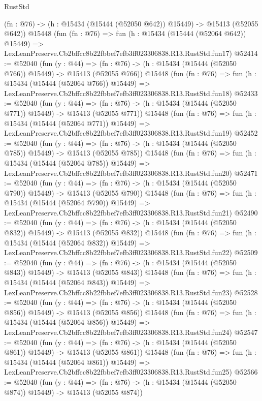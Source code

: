 \begin{lexlean}{RustStd}
\begin{coremodule}
    (fn : @76) -> (h : @15434 (@15444 (@52050 @642)) @15449) -> @15413 (@52055 @642))
    @15448
    (fun (fn : @76) =>
    fun (h : @15434 (@15444 (@52064 @642)) @15449) =>
    LexLeanPreserve.Cb2bffcc8b22fbbef7efb3ff023306838.R13.RustStd.fun17)
@52414 := @52040
    (fun (y : @44) =>
    (fn : @76) -> (h : @15434 (@15444 (@52050 @766)) @15449) -> @15413 (@52055 @766))
    @15448
    (fun (fn : @76) =>
    fun (h : @15434 (@15444 (@52064 @766)) @15449) =>
    LexLeanPreserve.Cb2bffcc8b22fbbef7efb3ff023306838.R13.RustStd.fun18)
@52433 := @52040
    (fun (y : @44) =>
    (fn : @76) -> (h : @15434 (@15444 (@52050 @771)) @15449) -> @15413 (@52055 @771))
    @15448
    (fun (fn : @76) =>
    fun (h : @15434 (@15444 (@52064 @771)) @15449) =>
    LexLeanPreserve.Cb2bffcc8b22fbbef7efb3ff023306838.R13.RustStd.fun19)
@52452 := @52040
    (fun (y : @44) =>
    (fn : @76) -> (h : @15434 (@15444 (@52050 @785)) @15449) -> @15413 (@52055 @785))
    @15448
    (fun (fn : @76) =>
    fun (h : @15434 (@15444 (@52064 @785)) @15449) =>
    LexLeanPreserve.Cb2bffcc8b22fbbef7efb3ff023306838.R13.RustStd.fun20)
@52471 := @52040
    (fun (y : @44) =>
    (fn : @76) -> (h : @15434 (@15444 (@52050 @790)) @15449) -> @15413 (@52055 @790))
    @15448
    (fun (fn : @76) =>
    fun (h : @15434 (@15444 (@52064 @790)) @15449) =>
    LexLeanPreserve.Cb2bffcc8b22fbbef7efb3ff023306838.R13.RustStd.fun21)
@52490 := @52040
    (fun (y : @44) =>
    (fn : @76) -> (h : @15434 (@15444 (@52050 @832)) @15449) -> @15413 (@52055 @832))
    @15448
    (fun (fn : @76) =>
    fun (h : @15434 (@15444 (@52064 @832)) @15449) =>
    LexLeanPreserve.Cb2bffcc8b22fbbef7efb3ff023306838.R13.RustStd.fun22)
@52509 := @52040
    (fun (y : @44) =>
    (fn : @76) -> (h : @15434 (@15444 (@52050 @843)) @15449) -> @15413 (@52055 @843))
    @15448
    (fun (fn : @76) =>
    fun (h : @15434 (@15444 (@52064 @843)) @15449) =>
    LexLeanPreserve.Cb2bffcc8b22fbbef7efb3ff023306838.R13.RustStd.fun23)
@52528 := @52040
    (fun (y : @44) =>
    (fn : @76) -> (h : @15434 (@15444 (@52050 @856)) @15449) -> @15413 (@52055 @856))
    @15448
    (fun (fn : @76) =>
    fun (h : @15434 (@15444 (@52064 @856)) @15449) =>
    LexLeanPreserve.Cb2bffcc8b22fbbef7efb3ff023306838.R13.RustStd.fun24)
@52547 := @52040
    (fun (y : @44) =>
    (fn : @76) -> (h : @15434 (@15444 (@52050 @861)) @15449) -> @15413 (@52055 @861))
    @15448
    (fun (fn : @76) =>
    fun (h : @15434 (@15444 (@52064 @861)) @15449) =>
    LexLeanPreserve.Cb2bffcc8b22fbbef7efb3ff023306838.R13.RustStd.fun25)
@52566 := @52040
    (fun (y : @44) =>
    (fn : @76) -> (h : @15434 (@15444 (@52050 @874)) @15449) -> @15413 (@52055 @874))

\end{coremodule}
\end{lexlean}
